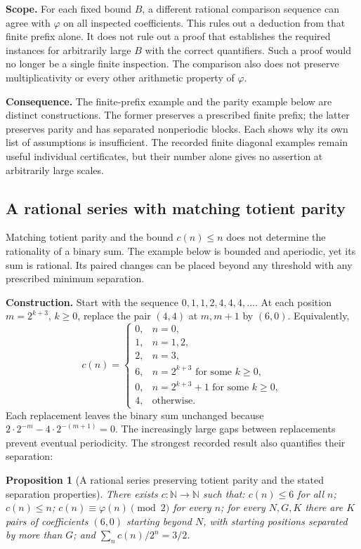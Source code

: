 \documentclass[11pt]{article}
\theoremstyle{plain}
\newtheorem{prop}[thm]{Proposition}
\theoremstyle{definition}
\theoremstyle{remark}
\newcommand{\lean}[2]{\leanlink{#2}}
\begin{document}
\textbf{Scope.} For each fixed bound $B$, a different rational
comparison sequence can agree with $\varphi$ on all inspected coefficients.
This rules out a deduction from that finite prefix alone. It does not rule
out a proof that establishes the required instances for arbitrarily large
$B$ with the correct quantifiers. Such a proof would no longer be a single
finite inspection. The comparison also does not preserve multiplicativity
or every other arithmetic property of $\varphi$.


\textbf{Consequence.} The finite-prefix example and the parity example
below are distinct constructions. The former preserves a prescribed finite
prefix; the latter preserves parity and has separated nonperiodic blocks.
Each shows why its own list of assumptions is insufficient. The recorded
finite diagonal examples remain useful individual certificates, but their
number alone gives no assertion at arbitrarily large scales.
\lean{Erdos249257.TotientTailPeriodKiller.certifiedKill_diagonal_all_imported_through_t64}{DiagonalPincerCertificatesT64.lean:1967}


\subsection{A rational series with matching totient parity}
\label{sec:parity-countermodel}

Matching totient parity and the bound $c(n)\le n$ does not determine
the rationality of a binary sum. The example below is bounded and
aperiodic, yet its sum is rational. Its paired changes can be placed
beyond any threshold with any prescribed minimum separation.

\textbf{Construction.} Start with the sequence
$0,1,1,2,4,4,4,\ldots$. At each position $m=2^{k+3}$, $k\ge0$, replace
the pair $(4,4)$ at $m,m+1$ by $(6,0)$. Equivalently,
\[
 c(n)=
 \begin{cases}
  0,&n=0,\\
  1,&n=1,2,\\
  2,&n=3,\\
  6,&n=2^{k+3}\text{ for some }k\ge0,\\
  0,&n=2^{k+3}+1\text{ for some }k\ge0,\\
  4,&\text{otherwise}.
 \end{cases}
\]
Each replacement leaves the binary sum unchanged because
$2\cdot2^{-m}-4\cdot2^{-(m+1)}=0$. The increasingly large gaps between
replacements prevent eventual periodicity. The strongest recorded result
also quantifies their separation:
\begin{prop}[A rational series preserving totient parity and the stated separation properties]\label{prop:rational-series-preserving-totient-parity}
There exists \(c:\mathbb N\to\mathbb N\) such that: \(c(n)\le6\) for all
\(n\); \(c(n)\le n\); \(c(n)\equiv\varphi(n)\pmod2\) for every \(n\); for
every \(N,G,K\) there are \(K\) pairs of coefficients \((6,0)\)
starting beyond \(N\), with starting positions separated by more
than \(G\); and
\(\sum_n c(n)/2^n = 3/2\).
\end{prop}
\end{document}
